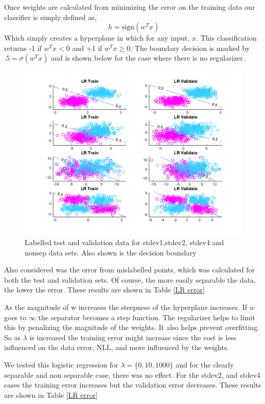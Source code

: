 \documentclass[10pt,twocolumn]{article}
\begin{document}
 Once weights are calculated from minimizing the error on the training data our classifier is simply defined as, 
 \begin{equation}
 h=\textrm{sign}(w^Tx)
 \end{equation}
 Which simply creates a hyperplane in which for any input, $x$. This classification returns -1 if $w^Tx<0$ and +1 if $w^Tx\geq 0$. The boundary decision is marked by $.5= \sigma (w^Tx)$ and is shown below for the case where there is no regularizer. 
 

 
 \begin{figure}[H]
\center
\includegraphics[scale =.4]{p1lambda0.png}
\caption{Labelled test and validation data for stdev1,stdev2, stdev4 and nonsep data sets. Also shown is the decision boundary }
\end{figure}
 
 Also considered was the error from mislabelled points, which was calculated for both the test and validation sets. Of course, the more easily separable the data, the lower the error. These results are shown in Table \ref{LR error}

As the magnitude of w increases the steepness of the hyperplane increases.  If $w$ goes to $ \infty$ the separator becomes a step function. The regularizer helps to limit this by penalizing the magnitude of the weights. It also helps prevent overfitting. So as $\lambda$ is increased the training error might increase since the cost is less influenced on the data error, NLL, and more influenced by the weights. 


We tested this logistic regression for $\lambda= \{0, 10, 1000\}$ and for the clearly separable and non separable case, there was no effect. For the stdev2, and stdev4 cases the training error increases but the validation error decreases. These results are shown in Table \ref{LR error}
\end{document}
